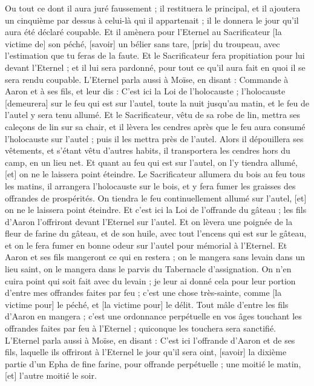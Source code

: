 \begin{multicols}{2}
Ou tout ce dont il aura juré faussement ; il restituera le principal, et il ajoutera un cinquième par dessus à celui-là qui il appartenait ; il le donnera le jour qu'il aura été déclaré coupable.
Et il amènera pour l'Eternel au Sacrificateur [la victime de] son péché, [savoir] un bélier sans tare, [pris] du troupeau, avec l'estimation que tu feras de la faute.
Et le Sacrificateur fera propitiation pour lui devant l'Eternel ; et il lui sera pardonné, pour tout ce qu'il aura fait en quoi il se sera rendu coupable.
L'Eternel parla aussi à Moïse, en disant :
Commande à Aaron et à ses fils, et leur dis : C'est ici la Loi de l'holocauste ; l'holocauste [demeurera] sur le feu qui est sur l'autel, toute la nuit jusqu'au matin, et le feu de l'autel y sera tenu allumé.
Et le Sacrificateur, vêtu de sa robe de lin, mettra ses caleçons de lin sur sa chair, et il lèvera les cendres après que le feu aura consumé l'holocauste sur l'autel ; puis il les mettra près de l'autel.
Alors il dépouillera ses vêtements, et s'étant vêtu d'autres habits, il transportera les cendres hors du camp, en un lieu net.
Et quant au feu qui est sur l'autel, on l'y tiendra allumé, [et] on ne le laissera point éteindre. Le Sacrificateur allumera du bois au feu tous les matins, il arrangera l'holocauste sur le bois, et y fera fumer les graisses des offrandes de prospérités.
On tiendra le feu continuellement allumé sur l'autel, [et] on ne le laissera point éteindre.
Et c'est ici la Loi de l'offrande du gâteau ; les fils d'Aaron l'offriront devant l'Eternel sur l'autel.
Et on lèvera une poignée de la fleur de farine du gâteau, et de son huile, avec tout l'encens qui est sur le gâteau, et on le fera fumer en bonne odeur sur l'autel pour mémorial à l'Eternel.
Et Aaron et ses fils mangeront ce qui en restera ; on le mangera sans levain dans un lieu saint, on le mangera dans le parvis du Tabernacle d'assignation.
On n'en cuira point qui soit fait avec du levain ; je leur ai donné cela pour leur portion d'entre mes offrandes faites par feu ; c'est une chose très-sainte, comme [la victime pour] le péché, et [la victime pour] le délit.
Tout mâle d'entre les fils d'Aaron en mangera ; c'est une ordonnance perpétuelle en vos âges touchant les offrandes faites par feu à l'Eternel ; quiconque les touchera sera sanctifié.
L'Eternel parla aussi à Moïse, en disant :
C'est ici l'offrande d'Aaron et de ses fils, laquelle ils offriront à l'Eternel le jour qu'il sera oint, [savoir] la dixième partie d'un Epha de fine farine, pour offrande perpétuelle ; une moitié le matin, [et] l'autre moitié le soir.

\end{multicols}
